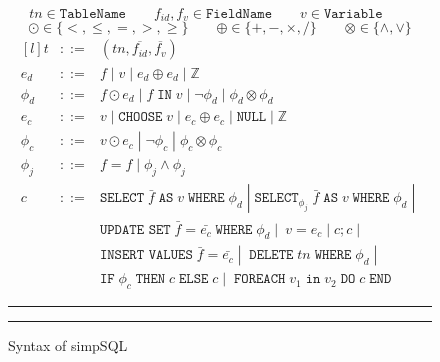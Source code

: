 \begin{figure}[h]
        $$
        tn \in \texttt{TableName} \qquad 
        f_{id},f_v \in \texttt{FieldName} \qquad 
        v \in \texttt{Variable} \qquad
        $$
        \vspace{-6mm} %
        $$ \odot \in \{<,\leq,=,>,\geq\} \qquad 
        \oplus \in \{+,-,\times,/ \} \qquad 
        \otimes \in \{\wedge, \vee\}
        $$
        $$
        \begin{matrix*}[l]
                
                

                t & ::= & (tn,\overline{f_{id}},\overline{f_{v}})\\
                e_d & ::= & f \;|\; v \;|\; e_d \oplus e_d \;|\; \mathbb{Z}\\ 
                \phi_d & ::= & f\odot e_d \;|\; f \; \texttt{IN} \; v \;|\; \neg \phi_d \;|\;\phi_d \otimes \phi_d  \\
                e_c & ::= &  v \;|\; \texttt{CHOOSE} \; v \;|\; e_c\oplus e_c \;|\; \texttt{NULL} \;|\; \mathbb{Z} \\
                \phi_c & ::= & v\odot e_c \;|\; \neg \phi_c \;|\;\phi_c \otimes \phi_c  \\
                \phi_j & ::= & f=f \;|\; \phi_j \wedge \phi_j  \\
                c   & ::=  & \texttt{SELECT}\; \bar{f} \;\texttt{AS}\; v \;\texttt{WHERE}\; \phi_d \;|\; 
		\texttt{SELECT}_{\phi_j}\; \bar{f} \;\texttt{AS}\; v\;\texttt{WHERE}\; \phi_d \;|\; \\
		& & \texttt{UPDATE SET}\; \bar{f}=\bar{e_c} \;\texttt{WHERE}\; \phi_d \;|\; \ v=e_c \;|\; c;c \;|\;\\ 
                & & \texttt{INSERT VALUES}\; \bar{f}=\bar{e_c} \;|\;
		\;\texttt{DELETE}\; tn \;\texttt{WHERE}\; \phi_d \;|\;\\
                & & \texttt{IF}\; \phi_c \;\texttt{THEN}\; c \;\texttt{ELSE}\; c \;|\; 
                \;\texttt{FOREACH}\; v_1 \;\texttt{in}\; v_2 \;\texttt{DO}\; c \;\texttt{END}\;
        \end{matrix*}
        $$
        \hrule \hrule

\caption{Syntax of simpSQL}
\label{fig:standard}
\end{figure}
